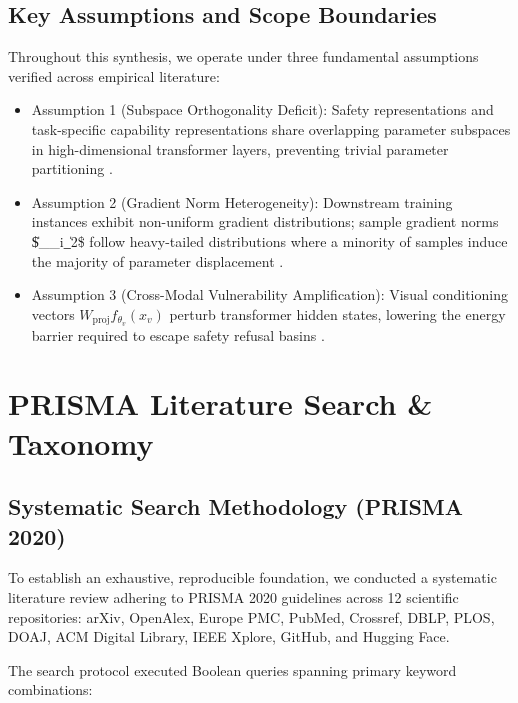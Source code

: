 \documentclass[10pt,twocolumn,letterpaper]{article}
\begin{document}
\subsection{Key Assumptions and Scope Boundaries}

Throughout this synthesis, we operate under three fundamental assumptions verified across empirical literature:
\begin{itemize}
  \item Assumption 1 (Subspace Orthogonality Deficit): Safety representations and task-specific capability representations share overlapping parameter subspaces in high-dimensional transformer layers, preventing trivial parameter partitioning \cite{arxiv_2406_00584}.
  \item Assumption 2 (Gradient Norm Heterogeneity): Downstream training instances exhibit non-uniform gradient distributions; sample gradient norms \$\|\nabla\_\Theta {}\_i\|\_2\$ follow heavy-tailed distributions where a minority of samples induce the majority of parameter displacement \cite{arxiv_2604_17215}.
  \item Assumption 3 (Cross-Modal Vulnerability Amplification): Visual conditioning vectors $W_{\text{proj}} f_{\theta_v}(x_v)$ perturb transformer hidden states, lowering the energy barrier required to escape safety refusal basins \cite{arxiv_2405_01543}.
\end{itemize}




\section{PRISMA Literature Search \& Taxonomy}



\subsection{Systematic Search Methodology (PRISMA 2020)}

To establish an exhaustive, reproducible foundation, we conducted a systematic literature review adhering to PRISMA 2020 guidelines across 12 scientific repositories: arXiv, OpenAlex, Europe PMC, PubMed, Crossref, DBLP, PLOS, DOAJ, ACM Digital Library, IEEE Xplore, GitHub, and Hugging Face.

The search protocol executed Boolean queries spanning primary keyword combinations:
\end{document}
